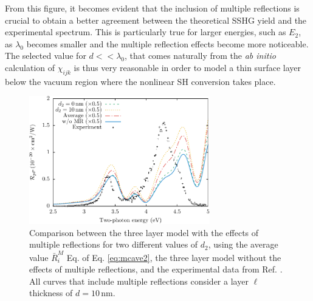 From this figure, it becomes evident that the inclusion of multiple reflections is crucial to obtain a better agreement between the theoretical SSHG yield and the experimental spectrum. This is particularly true for larger energies, such as $E_{2}$, as $\lambda_{0}$ becomes smaller and the multiple reflection effects become more noticeable. The selected value for $d << \lambda_{0}$, that comes naturally from the \emph{ab initio} calculation of $\chi_{ijk}$ is thus very reasonable in order to model a thin surface layer below the vacuum region where the nonlinear SH conversion takes place.

\begin{figure}
\centering
\includegraphics[width=0.7\textwidth]{content/figures/fig-4_4_14}
\caption{Comparison between the three layer model with the effects of multiple reflections for two different values of $d_{2}$, using the average value $\bar{R}^{M}_{i}$ Eq. of Eq. \eqref{eq:mcave2}, the three layer model without the effects of multiple reflections, and the experimental data from Ref. \cite{mejiaPRB02}. All curves that include multiple reflections consider a layer $\ell$ thickness of $d = 10\,\mathrm{nm}$.}
\label{fig:d2values}
\end{figure}

\stopcontents[chapters]
